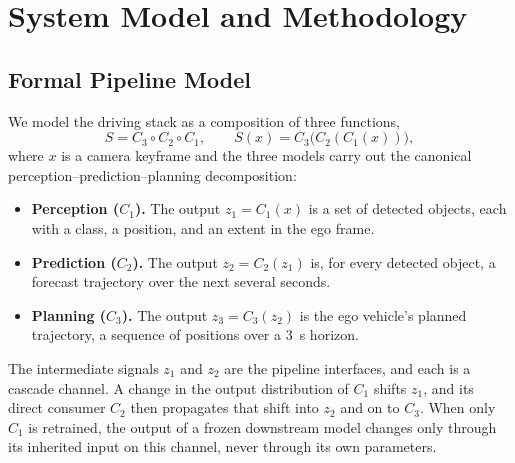 \documentclass[conference]{IEEEtran}
\begin{document}
\section{System Model and Methodology}
\label{sec:method}

\subsection{Formal Pipeline Model}
We model the driving stack as a composition of three functions,
\begin{equation}
S = C_3 \circ C_2 \circ C_1,
\qquad
S(x) = C_3\bigl(C_2(C_1(x))\bigr),
\label{eq:comp}
\end{equation}
where $x$ is a camera keyframe and the three models carry out the
canonical perception--prediction--planning decomposition:
\begin{itemize}
\item \textbf{Perception ($C_1$).} The output $z_1 = C_1(x)$ is a set of detected
objects, each with a class, a position, and an extent in the ego frame.
\item \textbf{Prediction ($C_2$).} The output $z_2 = C_2(z_1)$ is, for every
detected object, a forecast trajectory over the next several seconds.
\item \textbf{Planning ($C_3$).} The output $z_3 = C_3(z_2)$ is the ego vehicle's
planned trajectory, a sequence of positions over a $3$~s horizon.
\end{itemize}
The intermediate signals $z_1$ and $z_2$ are the pipeline interfaces, and each is
a cascade channel. A change in the output distribution of $C_1$ shifts $z_1$, and
its direct consumer $C_2$ then propagates that shift into $z_2$ and on to $C_3$.
When only $C_1$ is retrained, the output of a frozen downstream model changes only
through its inherited input on this channel, never through its own parameters.
\end{document}
